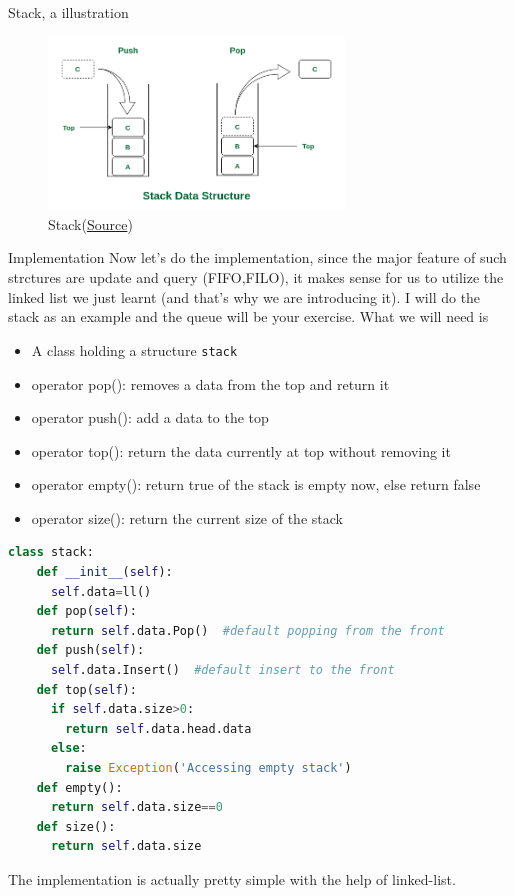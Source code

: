 \documentclass[10pt,xcolor={table,dvipsnames},t]{beamer}
\begin{document}
\begin{frame}{Stack, a illustration}
  \begin{figure}[h!]
    \includegraphics[width=0.7\textwidth]{img/stack.png}
    \caption{Stack(\href{https://www.geeksforgeeks.org/stack-data-structure/}{Source})}
  \end{figure}
\end{frame}

\begin{frame}{Implementation}
  Now let's do the implementation, since the major feature of such strctures are update and query (FIFO,FILO), it makes sense for us to utilize the linked list we just learnt (and that's why we are introducing it). I will do the stack as an example and the queue will be your exercise. What we will need is
  \begin{itemize}
    \item A class holding a structure \texttt{stack}
    \item operator pop(): removes a data from the top and return it
    \item operator push(): add a data to the top
    \item operator top(): return the data currently at top without removing it
    \item operator empty(): return true of the stack is empty now, else return false
    \item operator size(): return the current size of the stack
  \end{itemize}
\end{frame}

\begin{frame}[fragile]
\begin{lstlisting}[language=python]
  class stack:
    def __init__(self):
      self.data=ll()
    def pop(self):
      return self.data.Pop()  #default popping from the front
    def push(self):
      self.data.Insert()  #default insert to the front
    def top(self):
      if self.data.size>0: 
        return self.data.head.data
      else:
        raise Exception('Accessing empty stack')
    def empty():
      return self.data.size==0
    def size():
      return self.data.size
\end{lstlisting}
The implementation is actually pretty simple with the help of linked-list.
\end{frame}
\end{document}

